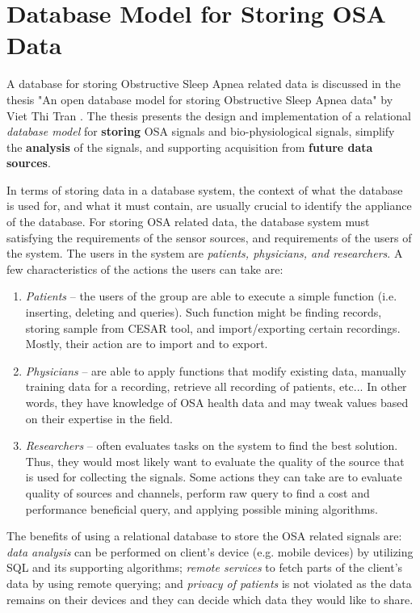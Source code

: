 \section{Database Model for Storing OSA Data}
A database for storing Obstructive Sleep Apnea related data is discussed in the thesis "An open database model for storing Obstructive Sleep Apnea data" by Viet Thi Tran \cite{viet}. The thesis presents the design and implementation of a relational \textit{database model} for \textbf{storing} OSA signals and bio-physiological signals, simplify the \textbf{analysis} of the signals, and supporting acquisition from \textbf{future data sources}. 

In terms of storing data in a database system, the context of what the database is used for, and what it must contain, are usually crucial to identify the appliance of the database. For storing OSA related data, the database system must satisfying the requirements of the sensor sources, and requirements of the users of the system. The users in the system are \textit{patients, physicians, and researchers}. A few characteristics of the actions the users can take are:
\begin{enumerate}
    \item \textit{Patients} -- the users of the group are able to execute a simple function (i.e. inserting, deleting and queries). Such function might be finding records, storing sample from CESAR tool, and import/exporting certain recordings. Mostly, their action are to import and to export. 
    \item \textit{Physicians} -- are able to apply functions that modify existing data, manually training data for a recording, retrieve all recording of patients, etc... In other words, they have knowledge of OSA health data and may tweak values based on their expertise in the field.
    
    \item \textit{Researchers} -- often evaluates tasks on the system to find the best solution. Thus, they would most likely want to evaluate the quality of the source that is used for collecting the signals. Some actions they can take are to evaluate quality of sources and channels, perform raw query to find a cost and performance beneficial query, and applying possible mining algorithms. 
\end{enumerate}

The benefits of using a relational database to store the OSA related signals are: \textit{data analysis} can be performed on client's device (e.g. mobile devices) by utilizing SQL and its supporting algorithms; \textit{remote services} to fetch parts of the client's data by using remote querying; and \textit{privacy of patients} is not violated as the data remains on their devices and they can decide which data they would like to share. 


